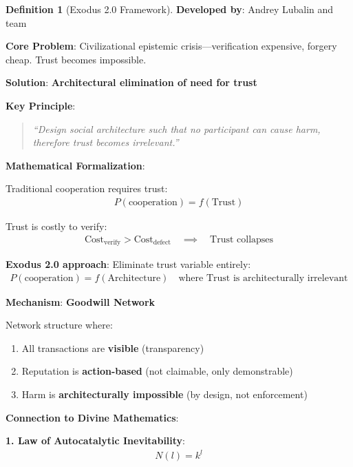 \documentclass[11pt,a4paper]{article}
\theoremstyle{definition}
\newtheorem{definition}{Definition}[section]
\theoremstyle{remark}
\begin{document}
\begin{small}
\begin{enumerate}
\begin{definition}[Exodus 2.0 Framework]
\textbf{Developed by}: Andrey Lubalin and team \cite{LubalinZeraoulia2025Deterministic, LubalinZeraoulia2025Chaos, LubalinZeraoulia2025Law, Lubalin2025DiscoveryLaw, Lubalin2024ExodusInnovation, Lubalin2024ExodusLaw, Lubalin2024BeyondTrust, Lubalin2024FromCentralized, Lubalin2024Impossible, Lubalin2024BeyondAISafety}

\textbf{Core Problem}: Civilizational epistemic crisis—verification expensive, forgery cheap. Trust becomes impossible.

\textbf{Solution}: \textbf{Architectural elimination of need for trust}

\textbf{Key Principle}:
\begin{quote}
\textit{``Design social architecture such that no participant can cause harm, therefore trust becomes irrelevant.''}
\end{quote}

\textbf{Mathematical Formalization}:

Traditional cooperation requires trust:
\begin{align}
P(\text{cooperation}) = f(\text{Trust})
\end{align}

Trust is costly to verify:
\begin{align}
\text{Cost}_{\text{verify}} > \text{Cost}_{\text{defect}} \quad \implies \quad \text{Trust collapses}
\end{align}

\textbf{Exodus 2.0 approach}: Eliminate trust variable entirely:
\begin{align}
P(\text{cooperation}) = f(\text{Architecture}) \quad \text{where Trust is architecturally irrelevant}
\end{align}

\textbf{Mechanism}: \textbf{Goodwill Network}

Network structure where:
\begin{enumerate}
    \item All transactions are \textbf{visible} (transparency)
    \item Reputation is \textbf{action-based} (not claimable, only demonstrable)
    \item Harm is \textbf{architecturally impossible} (by design, not enforcement)
\end{enumerate}

\textbf{Connection to Divine Mathematics}:

\textbf{1. Law of Autocatalytic Inevitability}:
\begin{align}
N(l) = k^l
\end{align}


\end{definition}
\end{enumerate}
\end{small}
\end{document}
